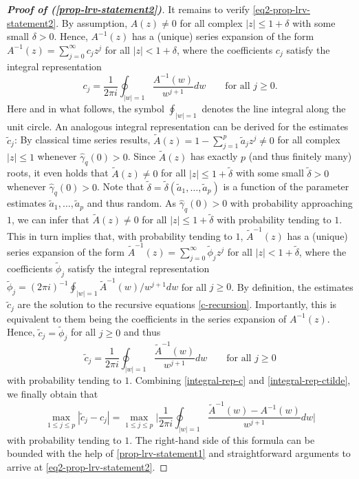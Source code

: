 \begin{proof}[\textnormal{\textbf{Proof of (\ref{prop-lrv-statement2})}}]
It remains to verify \eqref{eq2-prop-lrv-statement2}. By assumption, $A(z) \ne 0$ for all complex $|z| \le 1 + \delta$ with some small $\delta > 0$. Hence, $A^{-1}(z)$ has a (unique) series expansion of the form $A^{-1}(z) = \sum_{j=0}^{\infty} c_j z^j$ for all $|z| < 1 + \delta$, where the coefficients $c_j$ satisfy the integral representation 
\begin{equation}\label{integral-rep-c}
c_j = \frac{1}{2 \pi i} \oint_{|w|=1} \frac{A^{-1}(w)}{w^{j+1}} dw \qquad \text{for all } j \ge 0. 
\end{equation}
Here and in what follows, the symbol $\oint_{|w|=1}$ denotes the line integral along the unit circle. An analogous integral representation can be derived for the estimates $\widetilde{c}_j$: By classical time series results, $\widetilde{A}(z) = 1 - \sum_{j=1}^p \widetilde{a}_j z^j \ne 0$ for all complex $|z| \le 1$ whenever $\widehat{\gamma}_q(0) > 0$. Since $\widetilde{A}(z)$ has exactly $p$ (and thus finitely many) roots, it even holds that $\widetilde{A}(z) \ne 0$ for all $|z| \le 1 + \widetilde{\delta}$ with some small $\widetilde{\delta} > 0$ whenever $\widehat{\gamma}_q(0) > 0$. Note that $\widetilde{\delta} = \widetilde{\delta}(\widetilde{a}_1,\ldots,\widetilde{a}_p)$ is a function of the parameter estimates $\widetilde{a}_1,\ldots,\widetilde{a}_p$ and thus random. As $\widehat{\gamma}_q(0) > 0$ with probability approaching $1$, we can infer that $\widetilde{A}(z) \ne 0$ for all $|z| \le 1 + \widetilde{\delta}$ with probability tending to $1$. This in turn implies that, with probability tending to $1$, $\widetilde{A}^{-1}(z)$ has a (unique) series expansion of the form $\widetilde{A}^{-1}(z) = \sum_{j=0}^{\infty} \widetilde{\phi}_j z^j$ for all $|z| < 1 + \widetilde{\delta}$, where the coefficients $\widetilde{\phi}_j$ satisfy the integral representation $\widetilde{\phi}_j = (2 \pi i)^{-1} \oint_{|w|=1} \widetilde{A}^{-1}(w) / w^{j+1} dw$ for all $j \ge 0$. By definition, the estimates $\widetilde{c}_j$ are the solution to the recursive equations \eqref{c-recursion}. Importantly, this is equivalent to them being the coefficients in the series expansion of $A^{-1}(z)$. Hence, $\widetilde{c}_j = \widetilde{\phi}_j$ for all $j \ge 0$ and thus 
\begin{equation}\label{integral-rep-ctilde}
\widetilde{c}_j = \frac{1}{2 \pi i} \oint_{|w|=1} \frac{\widetilde{A}^{-1}(w)}{w^{j+1}} dw \qquad \text{for all } j \ge 0 
\end{equation} 
with probability tending to $1$. Combining \eqref{integral-rep-c} and \eqref{integral-rep-ctilde}, we finally obtain that  
\[ \max_{1 \le j \le p} |\widetilde{c}_j - c_j| = \max_{1 \le j \le p} \Big| \frac{1}{2 \pi i} \oint_{|w|=1} \frac{\widetilde{A}^{-1}(w) - A^{-1}(w)}{w^{j+1}} dw \Big| \]
with probability tending to $1$. The right-hand side of this formula can be bounded with the help of \eqref{prop-lrv-statement1} and straightforward arguments to arrive at \eqref{eq2-prop-lrv-statement2}. 
\end{proof}


